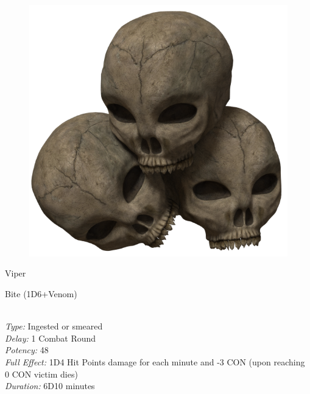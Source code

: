 \begin{figure}[b]
\begin{center}
\includegraphics[scale=0.11]{img/SkullPile.png}
\end{center}
\end{figure}



\begin{samepage}
\begin{monsterbox}{Viper}
	\basics[%
        hitpoints  = 7, 
	majorwound = 4,
	damagemodifier = 0,
	powerpoints = 13,
	movementrate = 30m,
	armor = Scales (1 AP),
	]
	\rpghline%
	\stats[ %
		STR = 2D6+6  (13),
		CON = 2D6    (6),
		DEX = 3D6+18 (27),
		SIZ = 2D6    (7),
		INT = 3      (3),
		POW = 2D6+6  (13),
		CHA = 3      (3)
	]
	\rpghline%
	\begin{rpg-monsteraction}
		Bite (1D6+Venom)
	\end{rpg-monsteraction}
	\begin{rpg-monsteraction}\\
		\textit{Type:} Ingested or smeared\\
		\textit{Delay:} 1 Combat Round\\
		\textit{Potency:} 48\\
		\textit{Full Effect:} 1D4 Hit Points damage for each minute and -3 CON (upon reaching 0 CON victim dies)\\ 
		\textit{Duration:} 6D10 minutes
	\end{rpg-monsteraction}
\end{monsterbox}
\end{samepage}

